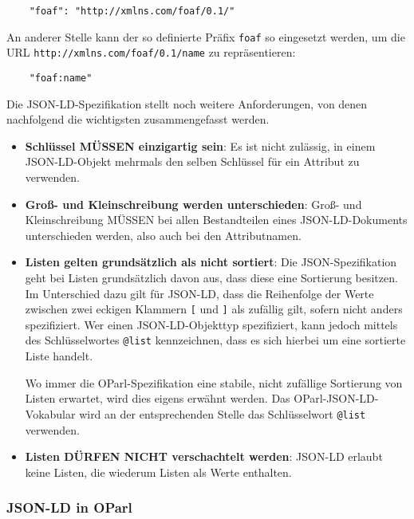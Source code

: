 \documentclass[,a4paper]{article}
\begin{document}
\begin{verbatim}
    "foaf": "http://xmlns.com/foaf/0.1/"
\end{verbatim}

An anderer Stelle kann der so definierte Präfix \texttt{foaf} so
eingesetzt werden, um die URL \texttt{http://xmlns.com/foaf/0.1/name} zu
repräsentieren:

\begin{verbatim}
    "foaf:name"
\end{verbatim}

Die JSON-LD-Spezifikation stellt noch weitere Anforderungen, von denen
nachfolgend die wichtigsten zusammengefasst werden.

\begin{itemize}
\item
  \textbf{Schlüssel MÜSSEN einzigartig sein}: Es ist nicht zulässig, in
  einem JSON-LD-Objekt mehrmals den selben Schlüssel für ein Attribut zu
  verwenden.
\item
  \textbf{Groß- und Kleinschreibung werden unterschieden}: Groß- und
  Kleinschreibung MÜSSEN bei allen Bestandteilen eines JSON-LD-Dokuments
  unterschieden werden, also auch bei den Attributnamen.
\item
  \textbf{Listen gelten grundsätzlich als nicht sortiert}: Die
  JSON-Spezifikation geht bei Listen grundsätzlich davon aus, dass diese
  eine Sortierung besitzen. Im Unterschied dazu gilt für JSON-LD, dass
  die Reihenfolge der Werte zwischen zwei eckigen Klammern \texttt{{[}}
  und \texttt{{]}} als zufällig gilt, sofern nicht anders spezifiziert.
  Wer einen JSON-LD-Objekttyp spezifiziert, kann jedoch mittels des
  Schlüsselwortes \texttt{@list} kennzeichnen, dass es sich hierbei um
  eine sortierte Liste handelt.

  Wo immer die OParl-Spezifikation eine stabile, nicht zufällige
  Sortierung von Listen erwartet, wird dies eigens erwähnt werden. Das
  OParl-JSON-LD-Vokabular wird an der entsprechenden Stelle das
  Schlüsselwort \texttt{@list} verwenden.
\item
  \textbf{Listen DÜRFEN NICHT verschachtelt werden}: JSON-LD erlaubt
  keine Listen, die wiederum Listen als Werte enthalten.
\end{itemize}

\subsubsection{JSON-LD in OParl}\label{jsonldux5foparl}
\end{document}
